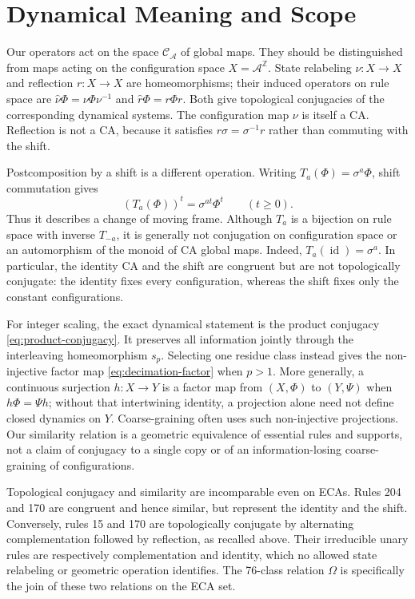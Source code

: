 \documentclass[11pt,a4paper]{article}
\newenvironment{revision}{\color{blue}}{}
\newenvironment{revision}{\color{black}}{}
\newcommand{\locmark}[1]{\label{#1}\linelabel{line:#1}}
\newcommand{\id}{\mathop{\mathrm{id}}}
\begin{document}
\begin{revision}
\section{Dynamical Meaning and Scope}
\label{sec:extended}\locmark{loc:dynamics}
Our operators act on the space $\mathcal C_{\mathcal A}$ of global maps.
They should be distinguished from maps acting on the configuration space
$X=\mathcal A^{\mathbb Z}$.
State relabeling $\nu:X\to X$ and reflection $r:X\to X$ are
homeomorphisms; their induced operators on rule space are
$\hat\nu\Phi=\nu\Phi\nu^{-1}$ and $\hat r\Phi=r\Phi r$.
Both give topological conjugacies of the corresponding dynamical systems.
The configuration map $\nu$ is itself a CA. Reflection is not a CA,
because it satisfies $r\sigma=\sigma^{-1}r$ rather than commuting
with the shift.

Postcomposition by a shift is a different operation. Writing
$T_a(\Phi)=\sigma^a\Phi$, shift commutation gives
\begin{equation}\label{eq:moving-frame}
(T_a(\Phi))^t=\sigma^{at}\Phi^t\qquad(t\geq0).
\end{equation}
Thus it describes a change of moving frame. Although $T_a$ is a bijection
on rule space with inverse $T_{-a}$, it is generally not conjugation on
configuration space or an automorphism of the monoid of CA global maps.
Indeed, $T_a(\id)=\sigma^a$.
In particular, the identity CA and the shift are congruent but are not
topologically conjugate: the identity fixes every configuration, whereas
the shift fixes only the constant configurations.

For integer scaling, the exact dynamical statement is the product
conjugacy \eqref{eq:product-conjugacy}. It preserves all information
jointly through the interleaving homeomorphism $s_p$.
Selecting one residue class instead gives the non-injective factor map
\eqref{eq:decimation-factor} when $p>1$.
More generally, a continuous surjection $h:X\to Y$ is a factor map
from $(X,\Phi)$ to $(Y,\Psi)$ when $h\Phi=\Psi h$; without that
intertwining identity, a projection alone need not define closed dynamics
on $Y$. Coarse-graining often uses such non-injective projections.
Our similarity relation is a geometric equivalence of essential rules
and supports, not a claim of conjugacy to a single copy or of an
information-losing coarse-graining of configurations.

Topological conjugacy and similarity are incomparable even on ECAs.
Rules 204 and 170 are congruent and hence similar, but represent the
identity and the shift. Conversely, rules 15 and 170 are topologically
conjugate by alternating complementation followed by reflection, as
recalled above. Their
irreducible unary rules are respectively complementation and identity,
which no allowed state relabeling or geometric operation identifies.
The 76-class relation $\Omega$ is specifically the join of these two
relations on the ECA set.


\end{revision}
\end{document}
